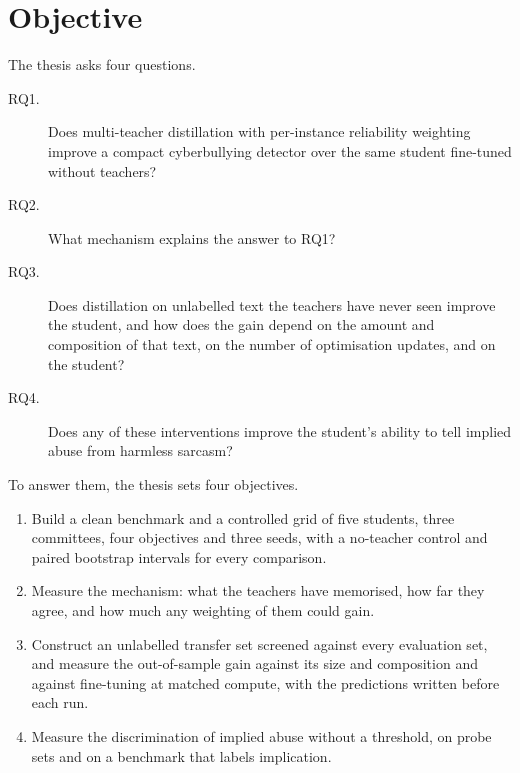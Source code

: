 \section{Objective}
\label{sec:1.4}
The thesis asks four questions.
\begin{description}
  \item[RQ1.] Does multi-teacher distillation with per-instance reliability weighting improve a compact
    cyberbullying detector over the same student fine-tuned without teachers?
  \item[RQ2.] What mechanism explains the answer to RQ1?
  \item[RQ3.] Does distillation on unlabelled text the teachers have never seen improve the student, and
    how does the gain depend on the amount and composition of that text, on the number of optimisation
    updates, and on the student?
  \item[RQ4.] Does any of these interventions improve the student's ability to tell implied abuse from
    harmless sarcasm?
\end{description}
To answer them, the thesis sets four objectives.
\begin{enumerate}
  \item Build a clean benchmark and a controlled grid of five students, three committees, four objectives
    and three seeds, with a no-teacher control and paired bootstrap intervals for every comparison.
  \item Measure the mechanism: what the teachers have memorised, how far they agree, and how much any
    weighting of them could gain.
  \item Construct an unlabelled transfer set screened against every evaluation set, and measure the
    out-of-sample gain against its size and composition and against fine-tuning at matched compute,
    with the predictions written before each run.
  \item Measure the discrimination of implied abuse without a threshold, on probe sets and on a benchmark
    that labels implication.
\end{enumerate}

